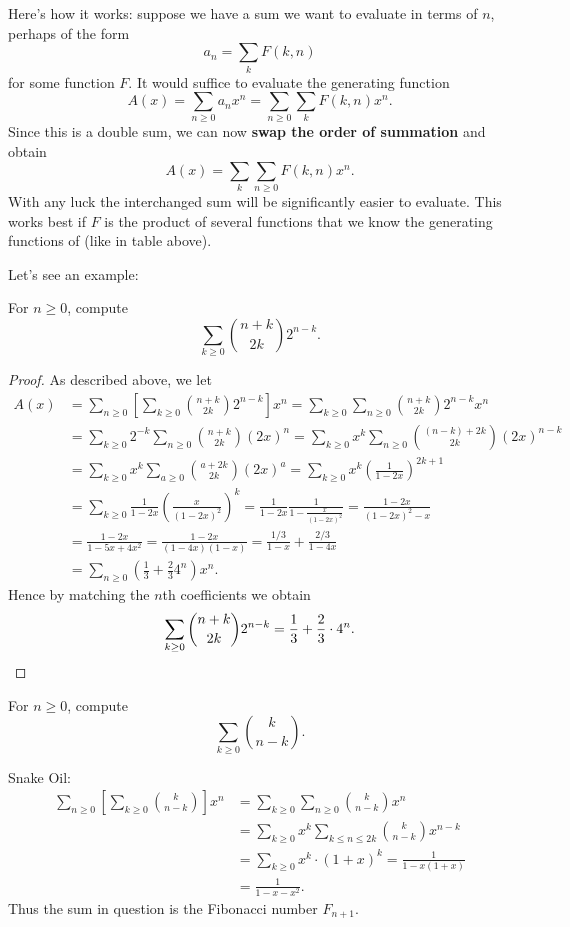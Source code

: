 \documentclass[11pt]{scrartcl}
\begin{document}
Here's how it works: suppose we have a sum we want to evaluate in terms of $n$,
perhaps of the form
\[ a_n = \sum_k F(k,n) \]
for some function $F$.
It would suffice to evaluate the generating function
\[ A(x) = \sum_{n \ge 0} a_n x^n = \sum_{n \ge 0} \sum_k F(k,n) x^n. \]
Since this is a double sum, we can now
\textbf{swap the order of summation} and obtain
\[ A(x) = \sum_k \sum_{n \ge 0} F(k,n) x^n. \]
With any luck the interchanged sum
will be significantly easier to evaluate.
This works best if $F$ is the product of several functions
that we know the generating functions of (like in table above).

Let's see an example:
\begin{example}
	For $n \ge 0$, compute
	\[ \sum_{k \ge 0} \binom{n+k}{2k} 2^{n-k}. \]
\end{example}
\begin{proof}
	As described above, we let
	\begin{align*}
		A(x) &= \sum_{n \ge 0}
		\left[ \sum_{k \ge 0} \binom{n+k}{2k} 2^{n-k} \right] x^n
		= \sum_{k \ge 0} \sum_{n \ge 0}
		\binom{n+k}{2k} 2^{n-k} x^n \\
		&= \sum_{k \ge 0} 2^{-k}
		\sum_{n \ge 0} \binom{n+k}{2k} (2x)^n
		= \sum_{k \ge 0} x^k
		\sum_{n \ge 0} \binom{(n-k) + 2k}{2k} (2x)^{n-k} \\
		&= \sum_{k \ge 0} x^k
		\sum_{a \ge 0} \binom{a + 2k}{2k} (2x)^{a}
		= \sum_{k \ge 0} x^k \left( \frac{1}{1-2x} \right)^{2k+1} \\
		&= \sum_{k \ge 0}
		\frac{1}{1-2x} \left( \frac{x}{(1-2x)^2} \right)^k
		=
		\frac{1}{1-2x} \frac{1}{1 - \frac{x}{(1-2x)^2}}
		= \frac{1-2x}{(1-2x)^2 - x} \\
		&= \frac{1-2x}{1-5x+4x^2}
		= \frac{1-2x}{(1-4x)(1-x)}
		= \frac{1/3}{1-x} + \frac{2/3}{1-4x} \\
		&= \sum_{n \ge 0} \left( \frac13 + \frac23 4^n \right)x^n.
	\end{align*}
	Hence by matching the $n$th coefficients we obtain
	\[
		\sum_{k \ge 0} \binom{n+k}{2k} 2^{n-k} 
		= \frac{1}{3} + \frac{2}{3} \cdot 4^n. \qedhere
	\]
\end{proof}

\begin{example}
	For $n \ge 0$, compute
	\[ \sum_{k \ge 0} \binom{k}{n-k} . \] %
\end{example}
\begin{soln}
	Snake Oil:
	\begin{align*}
		\sum_{n \ge 0} \left[ \sum_{k \ge 0} \binom{k}{n-k} \right] x^n
		&= \sum_{k \ge 0} \sum_{n \ge 0}\binom{k}{n-k} x^n \\
		&= \sum_{k \ge 0} x^k \sum_{k \le n \le 2k}\binom{k}{n-k} x^{n-k} \\
		&= \sum_{k \ge 0} x^k \cdot (1+x)^k
			= \frac{1}{1-x(1+x)} \\
		&= \frac{1}{1-x-x^2}.
	\end{align*}
	Thus the sum in question is the Fibonacci number $F_{n+1}$.
\end{soln}
\end{document}
